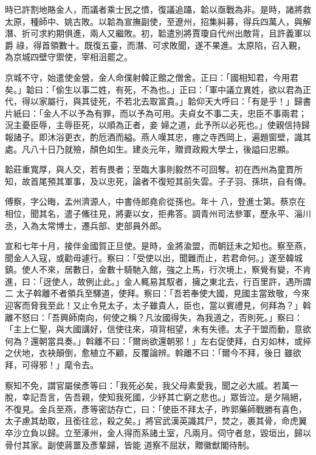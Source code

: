 \begin{pinyinscope}
 時已許割地賂金人，而議者乘士民之憤，復議追躡，韐以亟戰為非。是時，諸將救太原，種師中、姚古敗。以韐為宣撫副使，至遼州，招集糾募，得兵四萬人，與解潛、折可求約期俱進，兩人又繼敗。初，韐遣別將賈瓊自代州出敵背，且許義軍以爵
 祿，得首領數十。既復五臺，而潛、可求敗聞，遂不果進。太原陷，召入覲，為京城四壁守禦使，宰相沮罷之。



 京城不守，始遣使金營，金人命僕射韓正館之僧舍。正曰：「國相知君，今用君矣。」韐曰：「偷生以事二姓，有死，不為也。」正曰：「軍中議立異姓，欲以君為正代，得以家屬行，與其徒死，不若北去取富貴。」韐仰天大呼曰：「有是乎！」歸書片紙曰：「金人不以予為有罪，而以予為可用。夫貞女不事二夫，忠臣不事兩君；況主憂臣辱，主辱臣死，以順為正者，妾
 婦之道，此予所以必死也。」使親信持歸報諸子。即沐浴更衣，酌卮酒而縊。燕人嘆其忠，瘞之寺西岡上，遍題窗壁，識其處。凡八十日乃就殮，顏色如生。建炎元年，贈資政殿大學士，後謚曰忠顯。



 韐莊重寬厚，與人交，若有畏者；至臨大事則毅然不可回奪。初在西州為童貫所知，故首尾預其軍事，及以忠死，論者不復短其前失雲。子子羽、孫珙，自有傳。



 傅察，字公晦，孟州濟源人，中書侍郎堯俞從孫也。年十
 八，登進士第。蔡京在相位，聞其名，遣子鯈往見，將妻以女，拒弗答。調青州司法參軍，歷永平、淄川丞，入為太常博士，遷兵部、吏部員外郎。



 宣和七年十月，接伴金國賀正旦使。是時，金將渝盟，而朝廷未之知也。察至燕，聞金人入寇，或勸毋遽行。察曰：「受使以出，聞難而止，若君命何。」遂至韓城鎮。使人不來，居數日，金數十騎馳入館，強之上馬，行次境上，察覺有變，不肯進，曰：「迓使人，故例止此。」金人輒易其馭者，擁之東北去，行百里許，遇所謂二
 太子斡離不者領兵至驛道，使拜。察曰：「吾若奉使大國，見國主當致敬，今來迎客而脅我至此！又止令見太子，太子雖貴人，臣也，當以賓禮見，何拜為？」斡離不怒曰：「吾興師南向，何使之稱？凡汝國得失，為我道之，否則死。」察曰：「主上仁聖，與大國講好，信使往來，項背相望，未有失德。太子干盟而動，意欲何為？還朝當具奏。」斡離不曰：「爾尚欲還朝邪！」左右促使拜，白刃如林，或捽之伏地，衣袂顛倒，愈植立不顧，反覆論辨。斡離不曰：「爾今不拜，後日
 雖欲拜，可得邪！」麾令去。



 察知不免，謂官屬侯彥等曰：「我死必矣，我父母素愛我，聞之必大戚。若萬一脫，幸記吾言，告吾親，使知我死國，少紓其亡窮之悲也。」眾皆泣。是夕隔絕，不復見。金兵至燕，彥等密訪存亡，曰：「使臣不拜太子，昨郭藥師戰勝有喜色，太子慮其劫取，且銜往忿，殺之矣。」將官武漢英識其尸，焚之，裹其骨，命虎翼卒沙立負以歸。立至涿州，金人得而系諸土室，凡兩月。伺守者怠，毀垣出，歸以骨付其家。副使蔣噩及彥輩歸，皆能
 道察不屈狀，贈徽猷閣待制。




\end{pinyinscope}
